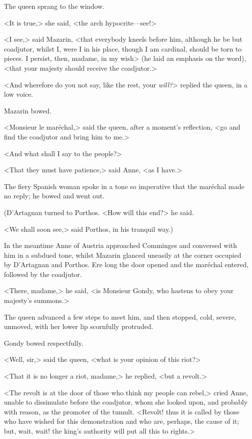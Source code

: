 The queen sprang to the window.

<It is true,> she said, <the arch hypocrite—see!>

<I see,> said Mazarin, <that everybody kneels before him, although he be but coadjutor, whilst I, were I in his place, though I am cardinal, should be torn to pieces. I persist, then, madame, in my wish> (he laid an emphasis on the word), <that your majesty should receive the coadjutor.>

<And wherefore do you not say, like the rest, your \emph{will?}> replied the queen, in a low voice.

Mazarin bowed.

<Monsieur le maréchal,> said the queen, after a moment's reflection, <go and find the coadjutor and bring him to me.>

<And what shall I say to the people?>

<That they must have patience,> said Anne, <as I have.>

The fiery Spanish woman spoke in a tone so imperative that the maréchal made no reply; he bowed and went out.

(D'Artagnan turned to Porthos. <How will this end?> he said.

<We shall soon see,> said Porthos, in his tranquil way.)

In the meantime Anne of Austria approached Comminges and conversed with him in a subdued tone, whilst Mazarin glanced uneasily at the corner occupied by D'Artagnan and Porthos. Ere long the door opened and the maréchal entered, followed by the coadjutor.

<There, madame,> he said, <is Monsieur Gondy, who hastens to obey your majesty's summons.>

The queen advanced a few steps to meet him, and then stopped, cold, severe, unmoved, with her lower lip scornfully protruded.

Gondy bowed respectfully.

<Well, sir,> said the queen, <what is your opinion of this riot?>

<That it is no longer a riot, madame,> he replied, <but a revolt.>

<The revolt is at the door of those who think my people can rebel,> cried Anne, unable to dissimulate before the coadjutor, whom she looked upon, and probably with reason, as the promoter of the tumult. <Revolt! thus it is called by those who have wished for this demonstration and who are, perhaps, the cause of it; but, wait, wait! the king's authority will put all this to rights.>

